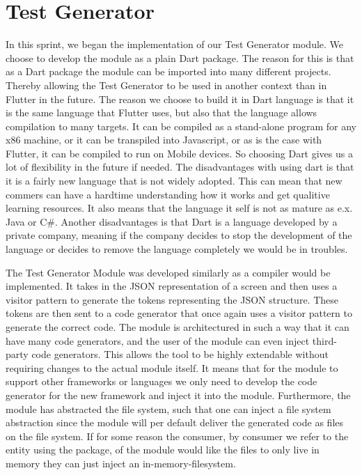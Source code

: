 \section{Test Generator}
In this sprint, we began the implementation of our Test Generator module. 
We choose to develop the module as a plain Dart package. 
The reason for this is that as a Dart package the module can be imported into many different projects.
Thereby allowing the Test Generator to be used in another context than in Flutter in the future.
The reason we choose to build it in Dart language is that it is the same language that Flutter uses, but also that the language allows compilation to many targets.
It can be compiled as a stand-alone program for any x86 machine, or it can be transpiled into Javascript, or as is the case with Flutter, it can be compiled to run on Mobile devices. 
So choosing Dart gives us a lot of flexibility in the future if needed.
The disadvantages with using dart is that it is a fairly new language that is not widely adopted.
This can mean that new commers can have a hardtime understanding how it works and get qualitive learning resources.
It also means that the language it self is not as mature as e.x. Java or C\#.
Another disadvantages is that Dart is a language developed by a private company, meaning if the company decides to stop the development of the language or decides to remove the language completely we would be in troubles.


The Test Generator Module was developed similarly as a compiler would be implemented.
It takes in the JSON representation of a screen and then uses a visitor pattern to generate the tokens representing the JSON structure.
These tokens are then sent to a code generator that once again uses a visitor pattern to generate the correct code.
The module is architectured in such a way that it can have many code generators, and the user of the module can even inject third-party code generators.
This allows the tool to be highly extendable without requiring changes to the actual module itself.
It means that for the module to support other frameworks or languages we only need to develop the code generator for the new framework and inject it into the module.
Furthermore, the module has abstracted the file system, such that one can inject a file system abstraction since the module will per default deliver the generated code as files on the file system. If for some reason the consumer, by consumer we refer to the entity using the package, of the module would like the files to only live in memory they can just inject an in-memory-filesystem.

